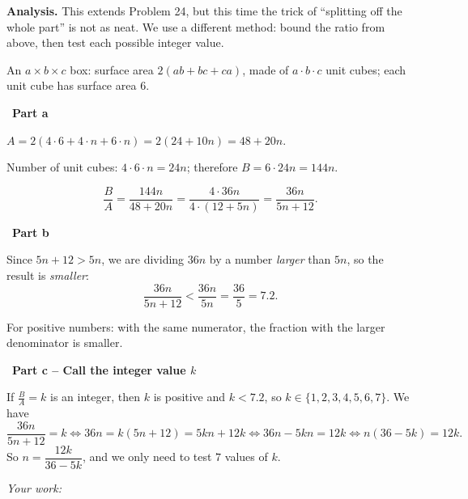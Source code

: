 \documentclass[11pt]{article}
\newif\ifsol \solfalse
\newcommand{\StuProb}[2]{\begin{probboxS}{#1}{#2}\StuProbBody\end{probboxS}}
\newcommand{\probsol}[1]{%
  \begin{lrbox}{\solmeasure}\begin{minipage}{\dimexpr\linewidth-24pt\relax}#1\end{minipage}\end{lrbox}%
  \ifsol
    \begin{solbox}#1\end{solbox}%
  \else
    \setlength{\solht}{\dimexpr\ht\solmeasure+\dp\solmeasure+0.85cm\relax}%
    \ifdim\solht<1.35cm\setlength{\solht}{1.35cm}\fi
    \ifdim\solht>\StudentMaxWork\setlength{\solht}{\StudentMaxWork}\fi
    \par\noindent\begin{minipage}{\linewidth}%
    \expandafter\StuProb\StuProbArgs
    \begin{tcolorbox}[colback=white,colframe=Line,boxrule=0.8pt,arc=5pt,
      left=8pt,right=8pt,top=4pt,bottom=4pt,height=\solht]{\footnotesize\color{Slate}\itshape\WorkWord}\end{tcolorbox}%
    \end{minipage}\par\medskip
  \fi}
\newlength{\StudentMaxWork}\setlength{\StudentMaxWork}{4.5cm}
\newcommand{\step}[2]{\par\smallskip\noindent{\bfseries\color{tmBlue!85!black}\StepWord~#1.}\ {\bfseries #2}\par\nopagebreak}
\def\WorkWord{Your work:}
\def\StepWord{Step}
\begin{document}
\probsol{
\textbf{Analysis.} This extends Problem 24, but this time the trick of ``splitting off the whole part'' is not as neat. We use a different method: bound the ratio from above, then test each possible integer value.
\begin{recallbox}An $a\times b\times c$ box: surface area $2(ab+bc+ca)$, made of $a\cdot b\cdot c$ unit cubes; each unit cube has surface area $6$.\end{recallbox}

\step{1}{Part a}
$A=2(4\cdot 6+4\cdot n+6\cdot n)=2(24+10n)=48+20n$.\par
Number of unit cubes: $4\cdot 6\cdot n=24n$; therefore $B=6\cdot 24n=144n$.\par
\[ \frac{B}{A}=\frac{144n}{48+20n}=\frac{4\cdot 36n}{4\cdot(12+5n)}=\frac{36n}{5n+12}. \]

\step{2}{Part b}
Since $5n+12>5n$, we are dividing $36n$ by a number \emph{larger} than $5n$, so the result is \emph{smaller}:
\[ \frac{36n}{5n+12}<\frac{36n}{5n}=\frac{36}{5}=7.2. \]
\begin{recallbox}For positive numbers: with the same numerator, the fraction with the larger denominator is smaller.\end{recallbox}

\step{3}{Part c -- Call the integer value $k$}
If $\frac{B}{A}=k$ is an integer, then $k$ is positive and $k<7.2$, so $k\in\{1,2,3,4,5,6,7\}$. We have
\[ \frac{36n}{5n+12}=k \iff 36n=k(5n+12)=5kn+12k \iff 36n-5kn=12k \iff n(36-5k)=12k. \]
So $n=\dfrac{12k}{36-5k}$, and we only need to test $7$ values of $k$.

}
\end{document}
